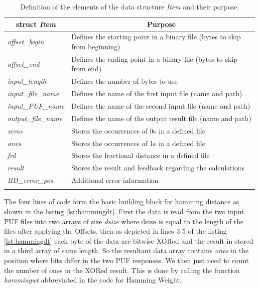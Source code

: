 \begin{table}[!ht]
	\begin{center}
		\begin{tabular}{ll}
			\toprule
			\multicolumn{1}{c}{\textbf{struct \emph{Item}}} & \multicolumn{1}{c}{\textbf{Purpose}}\\
			\midrule
			\hline

			\emph{offset\_begin} & Defines the starting point in a binary file (bytes to skip from beginning)\\

			\emph{offset\_end} & Defines the ending point in a binary file (bytes to skip from end)\\

			\emph{input\_length} & Defines the number of bytes to use \\

			\emph{input\_file\_name} & Defines the name of the first input file (name and path)\\

			\emph{input\_PUF\_name} & Defines the name of the second input file (name and path)\\

			\emph{output\_file\_name} & Defines the name of the output result file (name and path)\\

			\emph{zeros} & Stores the occurrences of 0s in a defined file\\

			\emph{ones} & Stores the occurrences of 1s in a defined file\\

			\emph{frd} & Stores the fractional distance in a defined file\\

			\emph{result} & Stores the result and feedback regarding the calculations\\

			\emph{HD\_error\_pos} & Additional error information \\

			\hline
			\addlinespace
			\bottomrule
		\end{tabular}
	\end{center}
	\caption{Definition of the elements of the data structure \emph{Item} and their purpose.}
	\label{table:item}
\end{table}

The four lines of code form the basic building block for hamming distance as shown in the listing \ref{lst:hammingdt}. First the data is read from the two input PUF files into two arrays of size \emph{dsize} where dsize is equal to the length of the files after applying the Offsets, then as depicted in lines 3-5 of the listing \ref{lst:hammingdt} each byte of the data are bitwise XORed and the result in stored in a third array of same length. So the resultant data array contains
\emph{ones} in the position where bits differ in the two PUF responses. We then just need to count the number of ones in the XORed result.
This is done by calling the function \emph{hammingwt} abbreviated in the code for Hamming Weight.\\

